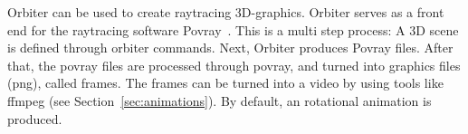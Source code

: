 \bigskip


Orbiter can be used to create raytracing 3D-graphics.
Orbiter serves as a front end for the raytracing software Povray~\cite{povray}.
This is a multi step process: 
A 3D scene is defined through orbiter commands. 
Next, Orbiter produces Povray files. 
After that, the 
povray files are processed through povray, and turned into graphics files (png), called frames. 
The frames can be turned into a video 
by using tools like ffmpeg (see Section~\ref{sec:animations}).
By default, an rotational animation is produced. 

\bigskip

